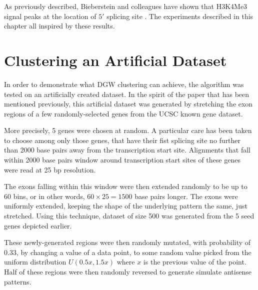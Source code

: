 \documentclass[parskip]{cs4rep}
\newcommand{\histonemodification}[1]{#1}
\begin{document}
As previously described, Bieberstein and colleagues have shown that \histonemodification{H3K4Me3} signal peaks at the location of $5'$ splicing site \cite{Bieberstein:2012tf}. The experiments described in this chapter all inspired by these results.

\section{Clustering an Artificial Dataset}

In order to demonstrate what DGW clustering can achieve, the algorithm was tested on an artificially created dataset. In the spirit of the paper that has been mentioned previously, this artificial dataset was generated by  stretching the exon regions of a few randomly-selected genes from the UCSC known gene dataset.

More precisely, 5 genes were chosen at random. A particular care has been taken to choose among only those genes, that have their fist splicing site no further than 2000 base pairs away from the transcription start site. Alignments that fall within 2000 base pairs window around transcription start sites of these genes were read at 25 bp resolution.

The exons falling within this window were then extended randomly to be up to 60 bins, or in other words, $60 \times 25=1500$ base pairs longer. The exons were uniformly extended, keeping the shape of the underlying pattern the same, just stretched. Using this technique, dataset of size 500 was generated from the 5 seed genes depicted earlier.

These newly-generated regions were then randomly mutated, with probability of $0.33$, by changing a value of a data point, to some random value picked from the uniform distribution $U(0.5x, 1.5x)$ where $x$ is the previous value of the point. Half of these regions were then randomly reversed to generate simulate antisense patterns.
\end{document}
